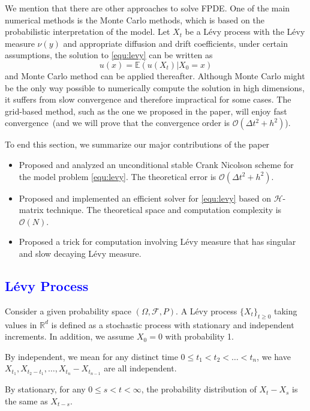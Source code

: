 \documentclass[10pt,a4paper]{article}
\newcommand{\RR}[0]{\mathbb{R}}
\newcommand{\lib}[1]{\textcolor{blue}{\section{#1}}}
\theoremstyle{definition}
\begin{document}
We mention that there are other approaches to solve FPDE. One of the main numerical methods is the Monte Carlo methods, which is based on the probabilistic interpretation of the model. Let $X_t$ be a L\'evy process with the L\'evy measure $\nu(y)$ and appropriate diffusion and drift coefficients, under certain assumptions, the solution to \cref{equ:levy} can be written as
\begin{equation}
	u(x) = \mathbb{E}(u(X_t)|X_0=x)
\end{equation}
and Monte Carlo method can be applied thereafter. Although Monte Carlo might be the only way possible to numerically compute the solution in high dimensions, it suffers from slow convergence and therefore impractical for some cases. The grid-based method, such as the one we proposed in the paper, will enjoy fast convergence~(and we will prove that the convergence order is $\mathcal{O}(\Delta t^2+h^2)$). 

To end this section, we summarize our major contributions of the paper
\begin{itemize}
	\item Proposed and analyzed an unconditional stable Crank Nicolson scheme for the model problem \cref{equ:levy}. The theoretical error is $\mathcal{O}(\Delta t^2 + h^2)$.
	\item Proposed and implemented an efficient solver for \cref{equ:levy} based on  $\mathcal{H}$-matrix technique. The theoretical space and computation complexity is $\mathcal{O}(N)$. 
	\item Proposed a trick for computation involving L\'evy measure that has singular and slow decaying L\'evy measure.
\end{itemize}



\lib{L\'evy Process}

Consider a given probability space $(\Omega, \mathcal{F}, P)$. A L\'evy process $\{X_t\}_{t\geq 0}$ taking values in $\RR^d$ is defined as a stochastic process with stationary and independent increments. In addition, we assume $X_0=0$ with probability 1. 

By independent, we mean for any distinct time $0\leq t_1<t_2<\ldots<t_n$, we have $X_{t_1}, X_{t_2-t_1}, \ldots, X_{t_n}-X_{t_{n-1}}$ are all independent. 

By stationary,  for any $0\leq s < t <\infty$, the probability distribution of $X_t-X_s$ is the same as $X_{t-s}$.
\end{document}

